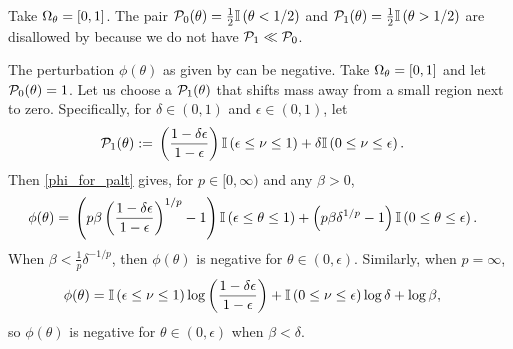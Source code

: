 \begin{ex}
%
Take $\Omega_{\theta} = [0,1]$.  The pair $\mathcal{P}_{0}(\theta)  = \frac{1}{2}\mathbb{I}\left(\theta < 1/2\right)$
and $\mathcal{P}_{1}(\theta) = \frac{1}{2} \mathbb{I}\left(\theta > 1/2\right)$ are disallowed
by  because we do not have $\mathcal{P}_{1} \ll \mathcal{P}_{0}$.
%
\end{ex}


\begin{ex}
%
The perturbation $\phi(\theta)$ as given by  can be
negative. Take $\Omega_{\theta} = [0,1]$ and let $\mathcal{P}_{0}(\theta) = 1$. Let us choose a
$\mathcal{P}_{1}(\theta)$ that shifts mass away from a small region next to zero.
Specifically, for  $\delta \in (0, 1)$ and $\epsilon \in (0, 1)$, let
%
\begin{align*}
%
\palt(\theta) :={}&
    \left(\frac{1-\delta \epsilon}{1 - \epsilon} \right)
        \ind{\epsilon \le \nu \le 1} +
    \delta \ind{0 \le \nu \le \epsilon}.
%
\end{align*}
%
Then \eqref{phi_for_palt} gives, for $p \in [0, \infty)$ and any $\beta > 0$,
%
\begin{align*}
%
\phi(\theta) ={}&
    \left( p \beta\left(\frac{1-\delta \epsilon}{1-\epsilon} \right)^{1/p}
        - 1
    \right)
        \ind{\epsilon \le \theta \le 1} +
    \left(p \beta \delta^{1/p} - 1 \right) \ind{0 \le \theta \le \epsilon}.
%
\end{align*}
%
When $\beta < \frac{1}{p} \delta^{-1/p}$, then $\phi(\theta)$ is negative for
$\theta \in (0, \epsilon)$.  Similarly, when $p = \infty$,
%
\begin{align*}
%
\phi(\theta) ={}&
    \ind{\epsilon \le \nu \le 1}
        \log \left(\frac{1-\delta \epsilon}{1 - \epsilon} \right) +
    \ind{0 \le \nu \le \epsilon} \log \delta + \log \beta,
%
\end{align*}
%
so $\phi(\theta)$ is negative for $\theta \in (0, \epsilon)$ when
$\beta < \delta$.


\end{ex}
